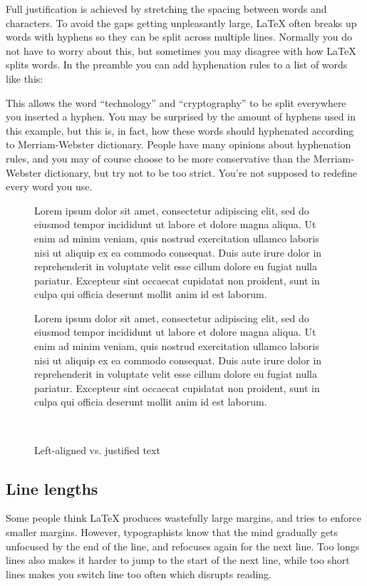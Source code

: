 {Full justification is achieved by stretching the spacing between words and characters. To avoid the gaps getting unpleasantly large, \LaTeX{} often breaks up words with hyphens so they can be split across multiple lines. Normally you do not have to worry about this, but sometimes you may disagree with how \LaTeX{} splits words. In the preamble you can add hyphenation rules to a list of words like this:

\noindent This allows the word ``technology'' and ``cryptography'' to be split everywhere you inserted a hyphen. You may be surprised by the amount of hyphens used in this example, but this is, in fact, how these words should hyphenated according to Merriam-Webster dictionary. People have many opinions about hyphenation rules, and you may of course choose to be more conservative than the Merriam-Webster dictionary, but try not to be too strict. You're not supposed to redefine every word you use.

\begin{figure}
	\centering\tiny\hfill%
	\begin{minipage}{0.4\textwidth}
		\raggedright
		Lorem ipsum dolor sit amet, consectetur adipiscing elit, sed do eiusmod tempor incididunt ut labore et dolore magna aliqua. Ut enim ad minim veniam, quis nostrud exercitation ullamco laboris nisi ut aliquip ex ea commodo consequat. Duis aute irure dolor in reprehenderit in voluptate velit esse cillum dolore eu fugiat nulla pariatur. Excepteur sint occaecat cupidatat non proident, sunt in culpa qui officia deserunt mollit anim id est laborum.
	\end{minipage}\hfill%
	\begin{minipage}{0.4\textwidth}
		Lorem ipsum dolor sit amet, consectetur adipiscing elit, sed do eiusmod tempor incididunt ut labore et dolore magna aliqua. Ut enim ad minim veniam, quis nostrud exercitation ullamco laboris nisi ut aliquip ex ea commodo consequat. Duis aute irure dolor in reprehenderit in voluptate velit esse cillum dolore eu fugiat nulla pariatur. Excepteur sint occaecat cupidatat non proident, sunt in culpa qui officia deserunt mollit anim id est laborum.
	\end{minipage}\hfill~
	\caption{Left-aligned vs. justified text}
	\label{fig:latex:alignment}
\end{figure}

\subsection{Line lengths}
Some people think \LaTeX{} produces wastefully large margins, and tries to enforce smaller margins. However, typographists know that the mind gradually gets unfocused by the end of the line, and refocuses again for the next line. Too longs lines also makes it harder to jump to the start of the next line, while too short lines makes you switch line too often which disrupts reading. 

}

